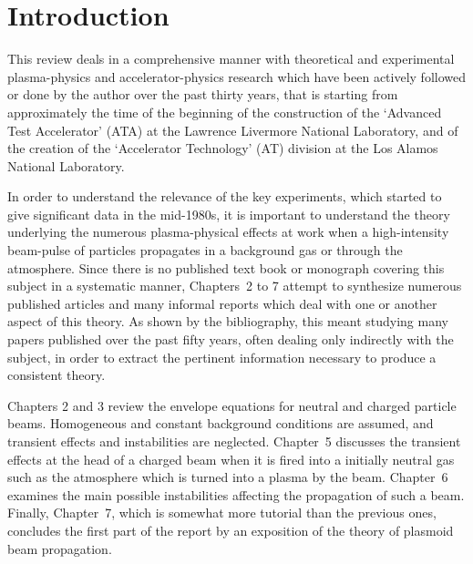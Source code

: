 \documentclass [12pt,a4paper,     ]{report} %
\begin{document}
\listoffigures


\listoftables


\chapter{Introduction}
\label{int:0}




This review deals in a comprehensive manner with theoretical and experimental plasma-physics and accelerator-physics research which have been actively followed or done by the author over the past thirty years, that is starting from approximately the time of the beginning of the construction of the `Advanced Test Accelerator' (ATA) at the Lawrence Livermore National Laboratory, and of the creation of the `Accelerator Technology' (AT) division at the Los Alamos National Laboratory.

In order to understand the relevance of the key experiments, which started to give significant data in the mid-1980s, it is important to understand the theory underlying the numerous plasma-physical effects at work when a high-intensity beam-pulse of particles propagates in a background gas or through the atmosphere.  Since there is no published text book or monograph covering this subject in a systematic manner, Chapters~2 to 7 attempt to synthesize numerous published articles and many informal reports which deal with one or another aspect of this theory.  As shown by the bibliography, this meant studying many papers published over the past fifty years, often dealing only indirectly with the subject, in order to extract the pertinent information necessary to produce a consistent theory.


Chapters 2 and 3 review the envelope equations for neutral and charged particle beams.  Homogeneous and constant background conditions are assumed, and transient effects and instabilities are neglected.  Chapter~5 discusses the transient effects at the head of a charged beam when it is fired into a initially neutral gas such as the atmosphere which is turned into a plasma by the beam.  Chapter~6 examines the main possible instabilities affecting the propagation of such a beam.  Finally, Chapter~7, which is somewhat more tutorial than the previous ones, concludes the first part of the report by an exposition of the theory of plasmoid beam propagation.
\end{document}
